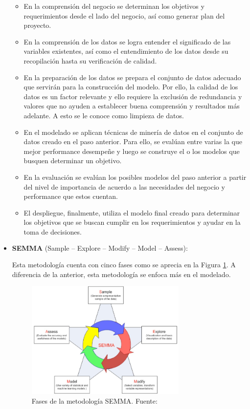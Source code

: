 \begin{itemize}
	\begin{itemize}
		\item En la comprensión del negocio se determinan los objetivos y requerimientos desde el lado del negocio, así como generar plan del proyecto.
		\item En la comprensión de los datos se logra entender el significado de las variables existentes, así como el entendimiento de los datos desde su recopilación hasta su verificación de calidad.
		\item En la preparación de los datos se prepara el conjunto de datos adecuado que servirán para la construcción del modelo. Por ello, la calidad de los datos es un factor relevante y ello requiere la exclusión de redundancia y valores que no ayuden a establecer buena comprensión y resultados más adelante. A esto se le conoce como limpieza de datos.
		\item En el modelado se aplican técnicas de minería de datos en el conjunto de datos creado en el paso anterior. Para ello, se evalúan entre varias la que mejor performance desempeñe y luego se construye el o los modelos que busquen determinar un objetivo.
		\item En la evaluación se evalúan los posibles modelos del paso anterior a partir del nivel de importancia de acuerdo a las necesidades del negocio y performance que estos cuentan.
		\item El despliegue, finalmente, utiliza el modelo final creado para determinar los objetivos que se buscan cumplir en los requerimientos y ayudar en la toma de decisiones.
	\end{itemize}
	
	\item \textbf{SEMMA} (Sample – Explore – Modify – Model – Assess):
	
	Esta metodología cuenta con cinco fases como se aprecia en la Figura \ref{2:fig9}. A diferencia de la anterior, esta metodología se enfoca más en el modelado.
	\begin{figure}[h]
		\begin{center}
			\includegraphics[width=0.75\textwidth]{2/figures/semma.jpg}
			\caption{Fases de la metodología SEMMA. Fuente: \cite{tec_braulio2015metodologiasdm}}
			\label{2:fig9}
		\end{center}
	\end{figure}
	

\end{itemize}
